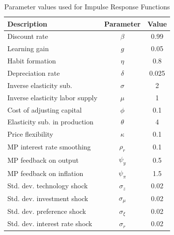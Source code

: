 \documentclass{beamer}
\begin{document}
\frame
{
\begin{table}[ht]
\caption{Parameter values used for Impulse Response Functions}\label{tb:calparms}
\begin{small}
\begin{center}
\begin{tabular}{|l|c|c|} \hline
Description & Parameter & Value \\ \hline
Discount rate & $\beta$ & 0.99 \\ 
Learning gain & $g$ & 0.05 \\
Habit formation & $\eta$ & 0.8 \\
Depreciation rate & $\delta$ & 0.025 \\
Inverse elasticity sub. & $\sigma$ & 2 \\ 
Inverse elasticity labor supply & $\mu$ & 1 \\ 
Cost of adjusting capital & $\phi$ & 0.1 \\ 
Elasticity sub. in production & $\theta$ & 4 \\ 
Price flexibility & $\kappa$ & 0.1 \\ 
MP interest rate smoothing & $\rho_r$ & 0.1 \\ 
MP feedback on output & $\psi_y$ & 0.5 \\ 
MP feedback on inflation & $\psi_{\pi}$ & 1.5 \\ 
Std. dev. technology shock & $\sigma_z$ & 0.02 \\ 
Std. dev. investment shock & $\sigma_{\mu}$ & 0.02 \\ 
Std. dev. preference shock & $\sigma_{\xi}$ & 0.02 \\ 
Std. dev. interest rate shock & $\sigma_{r}$ & 0.02 \\ \hline 
\end{tabular}
\end{center}
\end{small}
\end{table}
}
\end{document}
